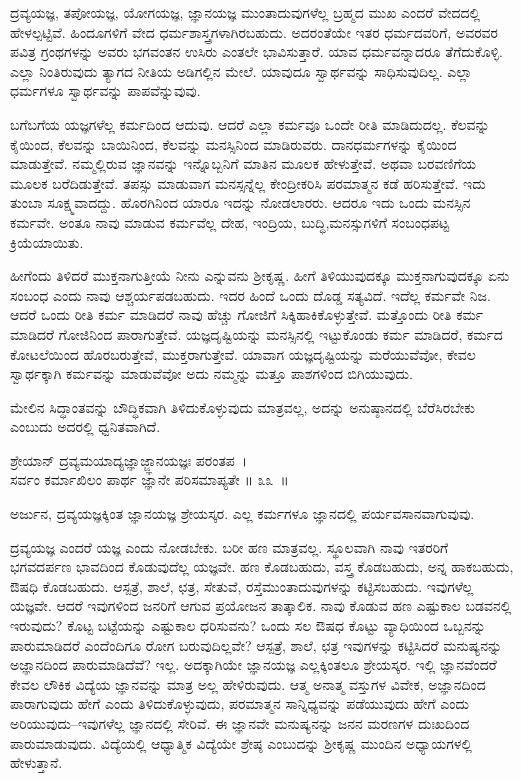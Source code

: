 ದ್ರವ್ಯಯಜ್ಞ, ತಪೋಯಜ್ಞ, ಯೋಗಯಜ್ಞ, ಜ್ಞಾನಯಜ್ಞ ಮುಂತಾದುವುಗಳೆಲ್ಲ ಬ್ರಹ್ಮದ ಮುಖ ಎಂದರೆ ವೇದದಲ್ಲಿ ಹೇಳಲ್ಪಟ್ಟಿವೆ. ಹಿಂದೂಗಳಿಗೆ ವೇದ ಧರ್ಮಶಾಸ್ತ್ರಗಳಾಗಿರಬಹುದು. ಅದರಂತೆಯೇ ಇತರ ಧರ್ಮದವರಿಗೆ, ಅವರವರ ಪವಿತ್ರ ಗ್ರಂಥಗಳನ್ನು ಅವರು ಭಗವಂತನ ಉಸಿರು ಎಂತಲೇ ಭಾವಿಸುತ್ತಾರೆ. ಯಾವ ಧರ್ಮವನ್ನಾದರೂ ತೆಗೆದುಕೊಳ್ಳಿ. ಎಲ್ಲಾ ನಿಂತಿರುವುದು ತ್ಯಾಗದ ನೀತಿಯ ಅಡಿಗಲ್ಲಿನ ಮೇಲೆ. ಯಾವುದೂ ಸ್ವಾರ್ಥವನ್ನು ಸಾಧಿಸುವುದಿಲ್ಲ. ಎಲ್ಲಾ ಧರ್ಮಗಳೂ ಸ್ವಾರ್ಥವನ್ನು ಪಾಪವೆನ್ನುವುವು.

ಬಗೆಬಗೆಯ ಯಜ್ಞಗಳೆಲ್ಲ ಕರ್ಮದಿಂದ ಆದುವು. ಆದರೆ ಎಲ್ಲಾ ಕರ್ಮವೂ ಒಂದೇ ರೀತಿ ಮಾಡಿದುದಲ್ಲ. ಕೆಲವನ್ನು ಕೈಯಿಂದ, ಕೆಲವನ್ನು ಬಾಯಿನಿಂದ, ಕೆಲವನ್ನು ಮನಸ್ಸಿನಿಂದ ಮಾಡಿರುವರು. ದಾನಧರ್ಮಗಳನ್ನು ಕೈಯಿಂದ ಮಾಡುತ್ತೇವೆ. ನಮ್ಮಲ್ಲಿರುವ ಜ್ಞಾನವನ್ನು ಇನ್ನೊಬ್ಬನಿಗೆ ಮಾತಿನ ಮೂಲಕ ಹೇಳುತ್ತೇವೆ. ಅಥವಾ ಬರವಣಿಗೆಯ ಮೂಲಕ ಬರೆದಿಡುತ್ತೇವೆ. ತಪಸ್ಸು ಮಾಡುವಾಗ ಮನಸ್ಸನ್ನೆಲ್ಲ ಕೇಂದ್ರೀಕರಿಸಿ ಪರಮಾತ್ಮನ ಕಡೆ ಹರಿಸುತ್ತೇವೆ. ಇದು ತುಂಬಾ ಸೂಕ್ಷ್ಮವಾದದ್ದು. ಹೊರಗಿನಿಂದ ಯಾರೂ ಇದನ್ನು ನೋಡಲಾರರು. ಆದರೂ ಇದು ಒಂದು ಮನಸ್ಸಿನ ಕರ್ಮವೇ. ಅಂತೂ ನಾವು ಮಾಡುವ ಕರ್ಮವೆಲ್ಲ ದೇಹ, ಇಂದ್ರಿಯ, ಬುದ್ಧಿ,\break ಮನಸ್ಸುಗಳಿಗೆ ಸಂಬಂಧಪಟ್ಟ ಕ್ರಿಯೆಯಾಯಿತು.

ಹೀಗೆಂದು ತಿಳಿದರೆ ಮುಕ್ತನಾಗುತ್ತೀಯೆ ನೀನು ಎನ್ನುವನು ಶ‍್ರೀಕೃಷ್ಣ. ಹೀಗೆ ತಿಳಿಯುವುದಕ್ಕೂ ಮುಕ್ತನಾಗುವುದಕ್ಕೂ ಏನು ಸಂಬಂಧ ಎಂದು ನಾವು ಆಶ್ಚರ್ಯಪಡಬಹುದು. ಇದರ ಹಿಂದೆ ಒಂದು ದೊಡ್ಡ ಸತ್ಯವಿದೆ. ಇದೆಲ್ಲ ಕರ್ಮವೇ ನಿಜ. ಆದರೆ ಒಂದು ರೀತಿ ಕರ್ಮ ಮಾಡಿದರೆ ನಾವು ಹೆಚ್ಚು ಗೋಜಿಗೆ ಸಿಕ್ಕಿಹಾಕಿಕೊಳ್ಳುತ್ತೇವೆ. ಮತ್ತೊಂದು ರೀತಿ ಕರ್ಮ ಮಾಡಿದರೆ ಗೋಜಿನಿಂದ ಪಾರಾಗುತ್ತೇವೆ. ಯಜ್ಞದೃಷ್ಟಿಯನ್ನು ಮನಸ್ಸಿನಲ್ಲಿ ಇಟ್ಟುಕೊಂಡು ಕರ್ಮ ಮಾಡಿದರೆ, ಕರ್ಮದ ಕೋಟಲೆಯಿಂದ ಹೊರಬರುತ್ತೇವೆ, ಮುಕ್ತರಾಗುತ್ತೇವೆ. ಯಾವಾಗ ಯಜ್ಞದೃಷ್ಟಿಯನ್ನು ಮರೆಯುವೆವೋ, ಕೇವಲ ಸ್ವಾರ್ಥಕ್ಕಾಗಿ ಕರ್ಮವನ್ನು ಮಾಡುವೆವೋ ಅದು ನಮ್ಮನ್ನು ಮತ್ತೂ ಪಾಶಗಳಿಂದ ಬಿಗಿಯುವುದು.

ಮೇಲಿನ ಸಿದ್ಧಾಂತವನ್ನು ಬೌದ್ಧಿಕವಾಗಿ ತಿಳಿದುಕೊಳ್ಳುವುದು ಮಾತ್ರವಲ್ಲ, ಅದನ್ನು ಅನುಷ್ಠಾನದಲ್ಲಿ ಬೆರೆಸಿರಬೇಕು ಎಂಬುದು ಅದರಲ್ಲಿ ಧ್ವನಿತವಾಗಿದೆ.

\begin{shloka}
ಶ್ರೇಯಾನ್ ದ್ರವ್ಯಮಯಾದ್ಯಜ್ಞಾಜ್ಜ್ಞಾನಯಜ್ಞಃ ಪರಂತಪ~।\\ಸರ್ವಂ ಕರ್ಮಾಖಿಲಂ ಪಾರ್ಥ ಜ್ಞಾನೇ ಪರಿಸಮಾಪ್ಯತೇ \hfill॥ ೩೩~॥
\end{shloka}

\begin{artha}
ಅರ್ಜುನ, ದ್ರವ್ಯಯಜ್ಞಕ್ಕಿಂತ ಜ್ಞಾನಯಜ್ಞ ಶ್ರೇಯಸ್ಕರ. ಎಲ್ಲ ಕರ್ಮಗಳೂ ಜ್ಞಾನದಲ್ಲಿ ಪರ್ಯವಸಾನ\-ವಾಗುವುವು.
\end{artha}

ದ್ರವ್ಯಯಜ್ಞ ಎಂದರೆ  ಯಜ್ಞ ಎಂದು ನೋಡಬೇಕು. ಬರೀ ಹಣ ಮಾತ್ರವಲ್ಲ. ಸ್ಥೂಲವಾಗಿ ನಾವು ಇತರರಿಗೆ ಭಗವದರ್ಪಣ ಭಾವದಿಂದ ಕೊಡುವುದೆಲ್ಲ ಯಜ್ಞವೇ. ಹಣ ಕೊಡಬಹುದು, ವಸ್ತ್ರ ಕೊಡಬಹುದು, ಅನ್ನ ಹಾಕಬಹುದು, ಔಷಧಿ ಕೊಡಬಹುದು. ಆಸ್ಪತ್ರೆ, ಶಾಲೆ, ಛತ್ರ, ಸೇತುವೆ, ರಸ್ತೆಮುಂತಾದುವುಗಳನ್ನು ಕಟ್ಟಿಸಬಹುದು. ಇವುಗಳೆಲ್ಲ ಯಜ್ಞವೇ. ಆದರೆ ಇವುಗಳಿಂದ ಜನರಿಗೆ ಆಗುವ ಪ್ರಯೋಜನ ತಾತ್ಕಾಲಿಕ. ನಾವು ಕೊಡುವ ಹಣ ಎಷ್ಟುಕಾಲ ಬಡವನಲ್ಲಿ ಇರುವುದು? ಕೊಟ್ಟ ಬಟ್ಟೆಯನ್ನು ಎಷ್ಟುಕಾಲ ಧರಿಸುವನು? ಒಂದು ಸಲ ಔಷಧ ಕೊಟ್ಟು ವ್ಯಾಧಿಯಿಂದ ಒಬ್ಬನನ್ನು ಪಾರುಮಾಡಿದರೆ ಎಂದೆಂದಿಗೂ ರೋಗ ಬರುವುದಿಲ್ಲವೇ? ಆಸ್ಪತ್ರೆ, ಶಾಲೆ, ಛತ್ರ ಇವುಗಳನ್ನು ಕಟ್ಟಿಸಿದರೆ ಮನುಷ್ಯನನ್ನು ಅಜ್ಞಾನದಿಂದ ಪಾರುಮಾಡಿದೆವೆ? ಇಲ್ಲ. ಅದಕ್ಕಾಗಿಯೇ ಜ್ಞಾನಯಜ್ಞ ಎಲ್ಲಕ್ಕಿಂತಲೂ ಶ್ರೇಯಸ್ಕರ. ಇಲ್ಲಿ ಜ್ಞಾನವೆಂದರೆ ಕೇವಲ ಲೌಕಿಕ ವಿದ್ಯೆಯ ಜ್ಞಾನವನ್ನು ಮಾತ್ರ ಅಲ್ಲ ಹೇಳಿರುವುದು. ಆತ್ಮ ಅನಾತ್ಮ ವಸ್ತುಗಳ ವಿವೇಕ, ಅಜ್ಞಾನದಿಂದ ಪಾರಾಗುವುದು ಹೇಗೆ ಎಂದು ತಿಳಿದುಕೊಳ್ಳುವುದು, ಪರಮಾತ್ಮನ ಸಾನ್ನಿಧ್ಯವನ್ನು ಪಡೆಯುವುದು ಹೇಗೆ ಎಂದು ಅರಿಯುವುದು–ಇವುಗಳೆಲ್ಲ ಜ್ಞಾನದಲ್ಲಿ ಸೇರಿವೆ. ಈ ಜ್ಞಾನವೇ ಮನುಷ್ಯನನ್ನು ಜನನ ಮರಣಗಳ ದುಃಖದಿಂದ ಪಾರುಮಾಡುವುದು. ವಿದ್ಯೆಯಲ್ಲಿ ಆಧ್ಯಾತ್ಮಿಕ ವಿದ್ಯೆಯೇ ಶ್ರೇಷ್ಠ ಎಂಬುದನ್ನು ಶ‍್ರೀಕೃಷ್ಣ ಮುಂದಿನ ಅಧ್ಯಾಯಗಳಲ್ಲಿ ಹೇಳುತ್ತಾನೆ.

